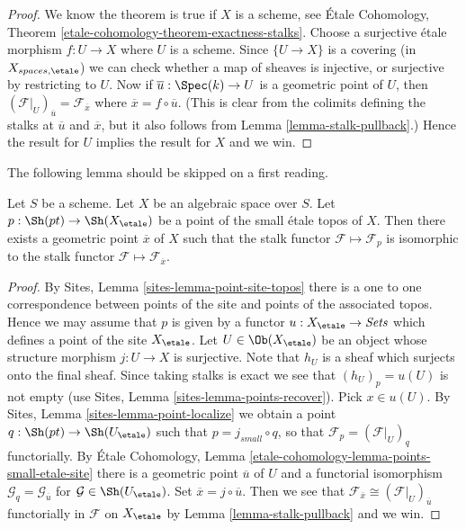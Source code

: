 \begin{proof}
We know the theorem is true if $X$ is a scheme, see
\'Etale Cohomology, Theorem \ref{etale-cohomology-theorem-exactness-stalks}.
Choose a surjective \'etale morphism $f : U \to X$ where $U$ is a scheme.
Since $\{U \to X\}$ is a covering (in $X_{spaces, \etale}$) we can check
whether a map of sheaves is injective, or surjective by restricting
to $U$. Now if $\overline{u} : \Spec(k) \to U$ is a geometric
point of $U$, then
$(\mathcal{F}|_U)_{\overline{u}} = \mathcal{F}_{\overline{x}}$
where $\overline{x} = f \circ \overline{u}$. (This is clear from the
colimits defining the stalks at $\overline{u}$ and $\overline{x}$, but
it also follows from
Lemma \ref{lemma-stalk-pullback}.)
Hence the result for $U$ implies the result for $X$ and we win.
\end{proof}

\noindent
The following lemma should be skipped on a first reading.

\begin{lemma}
\label{lemma-points-small-etale-site}
Let $S$ be a scheme.
Let $X$ be an algebraic space over $S$.
Let $p : \Sh(pt) \to \Sh(X_\etale)$
be a point of the small \'etale topos of $X$.
Then there exists a geometric point $\overline{x}$ of $X$
such that the stalk functor $\mathcal{F} \mapsto \mathcal{F}_p$
is isomorphic to the stalk functor
$\mathcal{F} \mapsto \mathcal{F}_{\overline{x}}$.
\end{lemma}

\begin{proof}
By
Sites, Lemma \ref{sites-lemma-point-site-topos}
there is a one to one correspondence between points of the site and points
of the associated topos. Hence we may assume that $p$ is given by
a functor $u : X_\etale \to \textit{Sets}$ which defines a point
of the site $X_\etale$.
Let $U \in \Ob(X_\etale)$ be an object whose structure morphism
$j : U \to X$ is surjective. Note that $h_U$ is a sheaf
which surjects onto the final sheaf. Since taking stalks is exact
we see that $(h_U)_p = u(U)$ is not empty (use
Sites, Lemma \ref{sites-lemma-points-recover}).
Pick $x \in u(U)$. By
Sites, Lemma \ref{sites-lemma-point-localize}
we obtain a point $q : \Sh(pt) \to \Sh(U_\etale)$
such that $p = j_{small} \circ q$, so that
$\mathcal{F}_p = (\mathcal{F}|_U)_q$ functorially.
By
\'Etale Cohomology, Lemma \ref{etale-cohomology-lemma-points-small-etale-site}
there is a geometric point $\overline{u}$ of $U$ and a functorial
isomorphism $\mathcal{G}_q = \mathcal{G}_{\overline{u}}$
for $\mathcal{G} \in \Sh(U_\etale)$. Set
$\overline{x} = j \circ \overline{u}$. Then we see that
$\mathcal{F}_{\overline{x}} \cong (\mathcal{F}|_U)_{\overline{u}}$
functorially in $\mathcal{F}$ on $X_\etale$ by
Lemma \ref{lemma-stalk-pullback}
and we win.
\end{proof}





